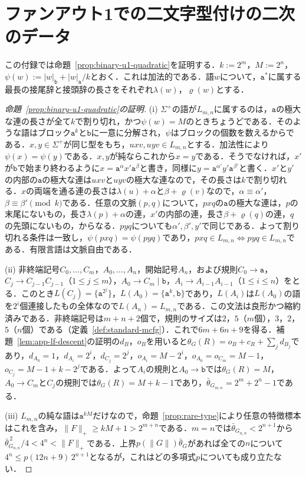 \documentclass[11pt,a4paper]{ltjsarticle}
\numberwithin{equation}{section}
\theoremstyle{plain}
\theoremstyle{definition}
\theoremstyle{remark}
\begin{document}
\section{ファンアウト1での二文字型付けの二次のデータ}
\label{app:binary-u1-quadratic}

この付録では命題~\ref{prop:binary-u1-quadratic}を証明する．$k:=2^m$，$M:=2^n$，$\psi(w):=|w|_{\mathtt b}+|w|_{\mathtt a}/k$とおく．これは加法的である．語$w$について，$\mathtt a^*$に属する最長の接尾辞と接頭辞の長さをそれぞれ$\lambda(w)$，$\varrho(w)$とする．

\begin{proof}[命題~\ref{prop:binary-u1-quadratic}の証明]
(i) $\Sigma^+$の語が$L_{m,n}$に属するのは，$\mathtt a$の極大な連の長さが全て$k$で割り切れ，かつ$\psi(w)=M$のときちょうどである．そのような語はブロック$\mathtt a^k$と$\mathtt b$に一意に分解され，$\psi$はブロックの個数を数えるからである．$x,y\in\Sigma^+$が同じ型をもち，$uxv,uyv\in L_{m,n}$とする．加法性により$\psi(x)=\psi(y)$である．$x,y$が純ならこれから$x=y$である．そうでなければ，$x'$が$\mathtt b$で始まり終わるように$x=\mathtt a^{\alpha}x'\mathtt a^{\beta}$と書き，同様に$y=\mathtt a^{\alpha'}y'\mathtt a^{\beta'}$と書く．$x'$と$y'$の内部の$\mathtt a$の極大な連は$uxv$と$uyv$の極大な連なので，その長さは$k$で割り切れる．$x$の両端を通る連の長さは$\lambda(u)+\alpha$と$\beta+\varrho(v)$なので，$\alpha\equiv\alpha'$，$\beta\equiv\beta'\pmod k$である．任意の文脈$(p,q)$について，$pxq$の$\mathtt a$の極大な連は，$p$の末尾にないもの，長さ$\lambda(p)+\alpha$の連，$x'$の内部の連，長さ$\beta+\varrho(q)$の連，$q$の先頭にないもの，からなる．$pyq$についても$\alpha',\beta',y'$で同じである．よって割り切れる条件は一致し，$\psi(pxq)=\psi(pyq)$であり，$pxq\in L_{m,n}\iff pyq\in L_{m,n}$である．有限言語は文脈自由である．

(ii) 非終端記号$C_0,\ldots,C_m$，$A_0,\ldots,A_n$，開始記号$A_n$，および規則$C_0\to\mathtt a$，$C_j\to C_{j-1}C_{j-1}$（$1\le j\le m$），$A_0\to C_m\mid\mathtt b$，$A_i\to A_{i-1}A_{i-1}$（$1\le i\le n$）をとる．このとき$L(C_j)=\{\mathtt a^{2^j}\}$，$L(A_0)=\{\mathtt a^k,\mathtt b\}$であり，$L(A_i)$は$L(A_0)$の語を$2^i$個連接したもの全体なので$L(A_n)=L_{m,n}$である．この文法は良形かつ縮約済みである．非終端記号は$m+n+2$個で，規則のサイズは$2$，$5$（$m$個），$3$，$2$，$5$（$n$個）である（定義~\ref{def:standard-mcfg}）．これで$6m+6n+9$を得る．補題~\ref{lem:app-lf-descent}の証明の$d_B$，$o_B$を用いると$\theta_G(R)=o_B+c_R+\sum_jd_{B_j}$であり，$d_{A_0}=1$，$d_{A_i}=2^i$，$d_{C_j}=2^j$，$o_{A_i}=M-2^i$，$o_{A_0}=o_{C_m}=M-1$，$o_{C_j}=M-1+k-2^j$である．よって$A_i$の規則と$A_0\to\mathtt b$では$\theta_G(R)=M$，$A_0\to C_m$と$C_j$の規則では$\theta_G(R)=M+k-1$であり，$\bar\theta_{G_{m,n}}=2^m+2^n-1$である．

(iii) $L_{m,n}$の純な語は$\mathtt a^{kM}$だけなので，命題~\ref{prop:rare-type}により任意の特徴標本はこれを含み，$\|F\|_+\ge kM+1>2^{m+n}$である．$m=n$では$\bar\theta_{G_{n,n}}<2^{n+1}$から$\bar\theta_{G_{n,n}}^{\,2}/4<4^n<\|F\|_+$である．上界$p(\|G\|)\bar\theta_G$があれば全ての$n$について$4^n\le p(12n+9)\,2^{n+1}$となるが，これはどの多項式$p$についても成り立たない．
\end{proof}
\end{document}
